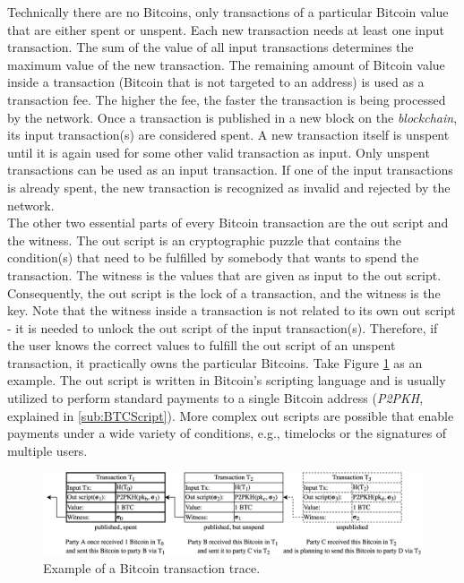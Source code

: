 \documentclass{cacthesis}
\begin{document}
        Technically there are no Bitcoins, only transactions of a particular Bitcoin value that are either spent or unspent. Each new transaction needs at least one input transaction. The sum of the value of all input transactions determines the maximum value of the new transaction. The remaining amount of Bitcoin value inside a transaction (Bitcoin that is not targeted to an address) is used as a transaction fee. The higher the fee, the faster the transaction is being processed by the network. Once a transaction is published in a new block on the \textit{blockchain}, its input transaction(s) are considered spent. A new transaction itself is unspent until it is again used for some other valid transaction as input. Only unspent transactions can be used as an input transaction. If one of the input transactions is already spent, the new transaction is recognized as invalid and rejected by the network. \\
        The other two essential parts of every Bitcoin transaction are the out script and the witness. The out script is an cryptographic puzzle that contains the condition(s) that need to be fulfilled by somebody that wants to spend the transaction. The witness is the values that are given as input to the out script. Consequently, the out script is the lock of a transaction, and the witness is the key. Note that the witness inside a transaction is not related to its own out script - it is needed to unlock the out script of the input transaction(s). Therefore, if the user knows the correct values to fulfill the out script of an unspent transaction, it practically owns the particular Bitcoins. Take Figure \ref{fig:tx1} as an example. The out script is written in Bitcoin's scripting language and is usually utilized to perform standard payments to a single Bitcoin address (\textit{P2PKH}, explained in \ref{sub:BTCScript}). More complex out scripts are possible that enable payments under a wide variety of conditions, e.g., timelocks or the signatures of multiple users.
        \begin{figure}
          \includegraphics[width=\linewidth]{images/basic_transaction_figure.png}
          \caption{Example of a Bitcoin transaction trace.}
          \label{fig:tx1}
        \end{figure}
\end{document}
